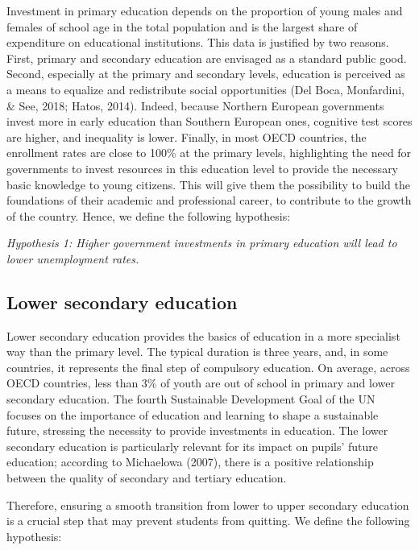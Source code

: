 \documentclass[
]{article}
\begin{document}
Investment in primary education depends on the proportion of young males
and females of school age in the total population and is the largest
share of expenditure on educational institutions. This data is justified
by two reasons. First, primary and secondary education are envisaged as
a standard public good. Second, especially at the primary and secondary
levels, education is perceived as a means to equalize and redistribute
social opportunities (Del Boca, Monfardini, \& See, 2018; Hatos, 2014).
Indeed, because Northern European governments invest more in early
education than Southern European ones, cognitive test scores are higher,
and inequality is lower. Finally, in most OECD countries, the enrollment
rates are close to 100\% at the primary levels, highlighting the need
for governments to invest resources in this education level to provide
the necessary basic knowledge to young citizens. This will give them the
possibility to build the foundations of their academic and professional
career, to contribute to the growth of the country. Hence, we define the
following hypothesis:

\emph{Hypothesis 1: Higher government investments in primary education
will lead to lower unemployment rates.}

\hypertarget{lower-secondary-education}{%
\subsection{Lower secondary education}\label{lower-secondary-education}}

Lower secondary education provides the basics of education in a more
specialist way than the primary level. The typical duration is three
years, and, in some countries, it represents the final step of
compulsory education. On average, across OECD countries, less than 3\%
of youth are out of school in primary and lower secondary education. The
fourth Sustainable Development Goal of the UN focuses on the importance
of education and learning to shape a sustainable future, stressing the
necessity to provide investments in education. The lower secondary
education is particularly relevant for its impact on pupils' future
education; according to Michaelowa (2007), there is a positive
relationship between the quality of secondary and tertiary education.

Therefore, ensuring a smooth transition from lower to upper secondary
education is a crucial step that may prevent students from quitting. We
define the following hypothesis:
\end{document}

